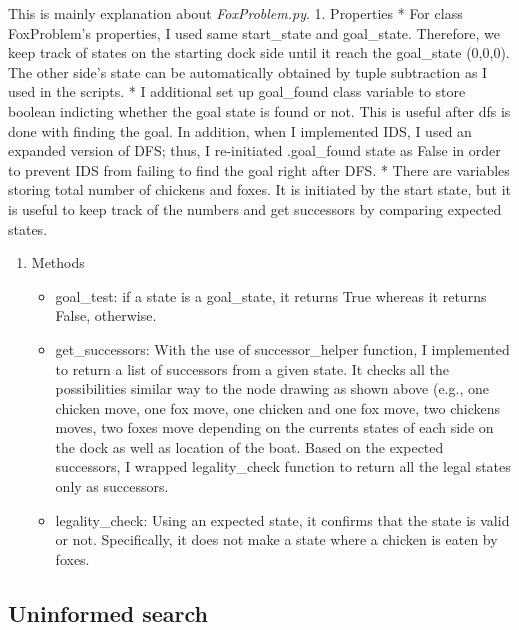 \documentclass[]{article}
\providecommand{\tightlist}{%
  \setlength{\itemsep}{0pt}\setlength{\parskip}{0pt}}
\begin{document}
This is mainly explanation about \emph{FoxProblem.py}. 1. Properties *
For class FoxProblem's properties, I used same start\_state and
goal\_state. Therefore, we keep track of states on the starting dock
side until it reach the goal\_state (0,0,0). The other side's state can
be automatically obtained by tuple subtraction as I used in the scripts.
* I additional set up goal\_found class variable to store boolean
indicting whether the goal state is found or not. This is useful after
dfs is done with finding the goal. In addition, when I implemented IDS,
I used an expanded version of DFS; thus, I re-initiated .goal\_found
state as False in order to prevent IDS from failing to find the goal
right after DFS. * There are variables storing total number of chickens
and foxes. It is initiated by the start state, but it is useful to keep
track of the numbers and get successors by comparing expected states.

\begin{enumerate}
\def\labelenumi{\arabic{enumi}.}
\setcounter{enumi}{1}
\tightlist
\item
  Methods

  \begin{itemize}
  \tightlist
  \item
    goal\_test: if a state is a goal\_state, it returns True whereas it
    returns False, otherwise.
  \item
    get\_successors: With the use of successor\_helper function, I
    implemented to return a list of successors from a given state. It
    checks all the possibilities similar way to the node drawing as
    shown above (e.g., one chicken move, one fox move, one chicken and
    one fox move, two chickens moves, two foxes move depending on the
    currents states of each side on the dock as well as location of the
    boat. Based on the expected successors, I wrapped legality\_check
    function to return all the legal states only as successors.
  \item
    legality\_check: Using an expected state, it confirms that the state
    is valid or not. Specifically, it does not make a state where a
    chicken is eaten by foxes.
  \end{itemize}
\end{enumerate}

\subsection{Uninformed search}\label{uninformed-search}
\end{document}
